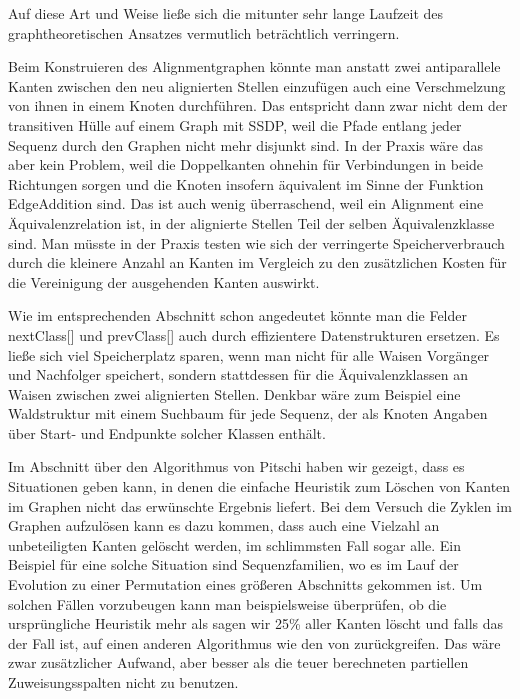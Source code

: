 \noindent Auf diese Art und Weise ließe sich die mitunter sehr lange Laufzeit des graphtheoretischen Ansatzes vermutlich beträchtlich verringern.

Beim Konstruieren des Alignmentgraphen könnte man anstatt zwei antiparallele Kanten zwischen den neu alignierten Stellen einzufügen auch eine Verschmelzung von ihnen in einem Knoten durchführen. Das entspricht dann zwar nicht dem der transitiven Hülle auf einem Graph mit SSDP, weil die Pfade entlang jeder Sequenz durch den Graphen nicht mehr disjunkt sind. In der Praxis wäre das aber kein Problem, weil die Doppelkanten ohnehin für Verbindungen in beide Richtungen sorgen und die Knoten insofern äquivalent im Sinne der Funktion \textrm{EdgeAddition} sind. Das ist auch wenig überraschend, weil ein Alignment eine Äquivalenzrelation ist, in der alignierte Stellen Teil der selben Äquivalenzklasse sind. Man müsste in der Praxis testen wie sich der verringerte Speicherverbrauch durch die kleinere Anzahl an Kanten im Vergleich zu den zusätzlichen Kosten für die Vereinigung der ausgehenden Kanten auswirkt.

Wie im entsprechenden Abschnitt schon angedeutet könnte man die Felder nextClass[] und prevClass[] auch durch effizientere Datenstrukturen ersetzen. Es ließe sich viel Speicherplatz sparen, wenn man nicht für alle Waisen Vorgänger und Nachfolger speichert, sondern stattdessen für die Äquivalenzklassen an Waisen zwischen zwei alignierten Stellen. Denkbar wäre zum Beispiel eine Waldstruktur mit einem Suchbaum für jede Sequenz, der als Knoten Angaben über Start- und Endpunkte solcher Klassen enthält.

Im Abschnitt über den Algorithmus von Pitschi haben wir gezeigt, dass es Situationen geben kann, in denen die einfache Heuristik zum Löschen von Kanten im Graphen nicht das erwünschte Ergebnis liefert. Bei dem Versuch die Zyklen im Graphen aufzulösen kann es dazu kommen, dass auch eine Vielzahl an unbeteiligten Kanten gelöscht werden, im schlimmsten Fall sogar alle. Ein Beispiel für eine solche Situation sind Sequenzfamilien, wo es im Lauf der Evolution zu einer Permutation eines größeren Abschnitts gekommen ist. Um solchen Fällen vorzubeugen kann man beispielsweise überprüfen, ob die ursprüngliche Heuristik mehr als sagen wir 25\% aller Kanten löscht und falls das der Fall ist, auf einen anderen Algorithmus wie den von \cite{els93} zurückgreifen. Das wäre zwar zusätzlicher Aufwand, aber besser als die teuer berechneten partiellen Zuweisungsspalten nicht zu benutzen.

